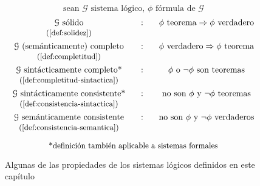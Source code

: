 \vfill
\begin{figure}[H]
\centering
\vspace{8pt}
$$\text{sean }\mathcal{G}\text{ sistema lógico, }\phi \text{ fórmula de }\mathcal{G}$$
$$
\begin{matrix}
\mathcal{G}\text{ sólido} & \;\;\;:\;\;\; & \phi\text{ teorema}\Rightarrow\phi\text{ verdadero}\\
\text{\small{(\cref{def:solidez})}}\\[4pt]
\mathcal{G}\text{ (semánticamente) completo} & : & \phi\text{ verdadero}\Rightarrow\phi\text{ teorema}\\
\text{\small{(\cref{def:completitud})}}\\[4pt]
\mathcal{G}\text{ sintácticamente completo*} & : & \phi\text{ o }\neg\phi\text{ son teoremas}\\
\text{\small{(\cref{def:completitud-sintactica})}}\\[4pt]
\mathcal{G}\text{ sintácticamente consistente*} & : & \text{no son }\phi\text{ y }\neg\phi\text{ teoremas}\\
\text{\small{(\cref{def:consistencia-sintactica})}}\\[4pt]
\mathcal{G}\text{ semánticamente consistente} & : & \text{no son }\phi\text{ y }\neg\phi\text{ verdaderos}\\
\text{\small{(\cref{def:consistencia-semantica})}}\\[4pt]
\end{matrix}
$$
$$\text{\small{*definición también aplicable a sistemas formales}}$$
\caption{Algunas de las propiedades de los sistemas lógicos definidos en este capítulo}
\label{fig:definiciones-logica}
\end{figure}
\vfill
\endinput
